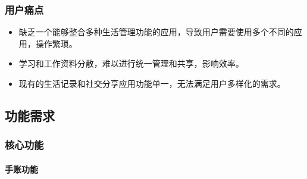 \documentclass[a4paper]{article}
\begin{document}
\subsubsection{用户痛点}

\begin{itemize}
    \item 缺乏一个能够整合多种生活管理功能的应用，导致用户需要使用多个不同的应用，操作繁琐。
    \item 学习和工作资料分散，难以进行统一管理和共享，影响效率。
    \item 现有的生活记录和社交分享应用功能单一，无法满足用户多样化的需求。
\end{itemize}

\subsection{功能需求}

\subsubsection{核心功能}

\paragraph{手账功能}
\end{document}
